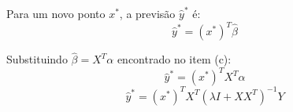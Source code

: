 
Para um novo ponto $ x^* $, a previsão $ \hat{y}^* $ é:
$$ \hat{y}^* = (x^*)^T \hat{\beta} $$

Substituindo $ \hat{\beta} = X^T \alpha $ encontrado no item (c):
$$ \hat{y}^* = (x^*)^T X^T \alpha $$
$$ \hat{y}^* = (x^*)^T X^T \left( \lambda I + XX^T \right)^{-1} Y $$
